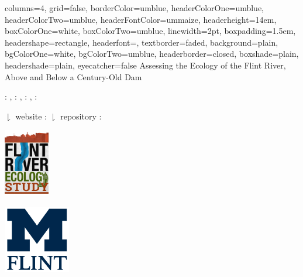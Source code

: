 \documentclass[b0paper,margin=1cm,landscape]{baposter}
\begin{document}

\begin{poster}{
  columns=4,
	grid=false,
	borderColor=umblue,
	headerColorOne=umblue,
	headerColorTwo=umblue,
	headerFontColor=ummaize,
  headerheight=14em,
	boxColorOne=white,
  boxColorTwo=umblue,
  linewidth=2pt,
  boxpadding=1.5em,
	headershape=rectangle,
	headerfont=\Large\textsf,
	textborder=faded,
	background=plain,
  bgColorOne=white,
  bgColorTwo=umblue,
	headerborder=closed,
  boxshade=plain,
  headershade=plain,
  eyecatcher=false
}
{
}
{Assessing the Ecology of the Flint River, Above and Below a Century-Old Dam}
{
  \vspace{0mm}
   : \textit{\color{violet}{summersj@umich.edu}}, 
   : \textit{\color{violet}{arelkins@umich.edu}}, 
   : \textit{\color{violet}{casonk@umich.edu}}, 
   : \textit{\color{violet}{hdawson@umich.edu}} 
  
  \hspace{1mm} $\downharpoonright$ website : \textit{\color{violet}{https://flintriverecostudy.com}}
  \hspace{1mm} $\downharpoonright$ repository : \textit{\color{violet}{https://github.com/casonk/Flint\_River\_Ecology}}
}
{
  \begin{minipage}{8.0em}
    \includegraphics[height=8em]{Img/Ecology_Study.png}
  \end{minipage}
  \begin{minipage}{8.0em}
    \includegraphics[height=8em]{Img/University_of_Michigan_Flint.png}
  \end{minipage}
}


\end{poster}
\end{document}
